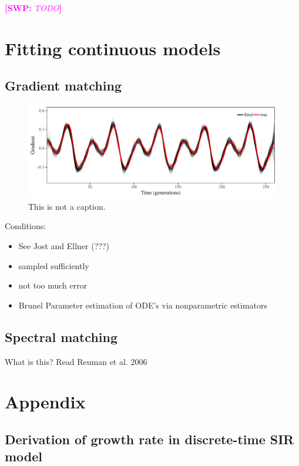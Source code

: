 \documentclass{article}
\newcommand{\comment}[3]{\textcolor{#1}{\textbf{[#2: }\textsl{#3}\textbf{]}}}
\newcommand{\swp}[1]{\comment{magenta}{SWP}{#1}}
\begin{document}
\swp{TODO}


\section{Fitting continuous models}

\subsection{Gradient matching}

\begin{figure}[t]
\includegraphics[width=\textwidth]{../figure/gradient_matching_sinusoidal.pdf}
\caption{This is not a caption.}
\end{figure}

Conditions:
\begin{itemize}
	\item See Jost and Ellner (???)
	\item sampled sufficiently
	\item not too much error
	\item Brunel Parameter estimation of ODE’s via nonparametric estimators
\end{itemize}



\subsection{Spectral matching}

What is this? Read Reuman et al. 2006




\pagebreak

\section{Appendix}

\subsection{Derivation of growth rate in discrete-time SIR model}
\end{document}
